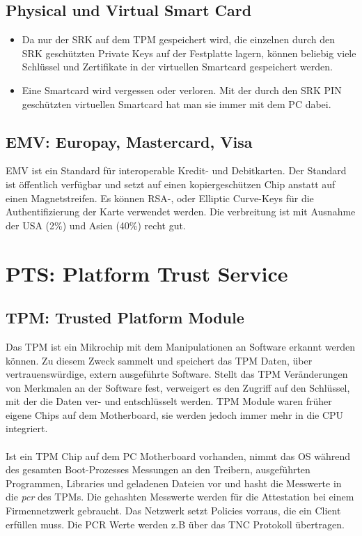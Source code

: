 \subsection{Physical und Virtual Smart Card}
\begin{itemize}
    \item Da nur der SRK auf dem TPM gespeichert wird, die einzelnen durch den SRK geschützten Private Keys auf der Festplatte lagern, können beliebig viele Schlüssel und Zertifikate in der virtuellen Smartcard gespeichert werden.
    \item Eine Smartcard wird vergessen oder verloren. Mit der durch den SRK PIN geschützten virtuellen Smartcard hat man sie immer mit dem PC dabei.
\end{itemize}

\subsection{EMV: Europay, Mastercard, Visa}
EMV ist ein Standard für interoperable Kredit- und Debitkarten. Der Standard ist öffentlich verfügbar und setzt auf einen kopiergeschützen Chip anstatt auf einen Magnetstreifen. Es können RSA-, oder Elliptic Curve-Keys für die Authentifizierung der Karte verwendet werden. Die verbreitung ist mit Ausnahme der USA (2\%) und Asien (40\%) recht gut.


\section{PTS: Platform Trust Service}
\subsection{TPM: Trusted Platform Module}\label{sec:tpm} 
Das TPM ist ein Mikrochip mit dem Manipulationen an Software erkannt werden können. Zu diesem Zweck sammelt und speichert das TPM Daten, über vertrauenswürdige, extern ausgeführte Software. Stellt das TPM Veränderungen von Merkmalen an der Software fest, verweigert es den Zugriff auf den Schlüssel, mit der die Daten ver- und entschlüsselt werden. TPM Module waren früher eigene Chips auf dem Motherboard, sie werden jedoch immer mehr in die CPU integriert. \\\\
Ist ein TPM Chip auf dem PC Motherboard vorhanden, nimmt das OS während des gesamten Boot-Prozesses Messungen an den Treibern, ausgeführten Programmen, Libraries und geladenen Dateien vor und hasht die Messwerte in die \textit{pcr} des TPMs. Die gehashten Messwerte werden für die Attestation bei einem Firmennetzwerk gebraucht. Das Netzwerk setzt Policies vorraus, die ein Client erfüllen muss. Die PCR Werte werden z.B über das TNC Protokoll übertragen. 

